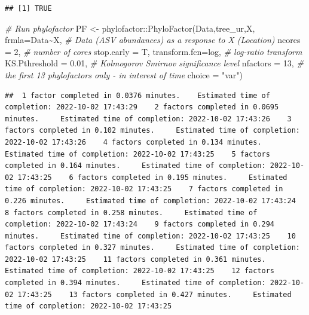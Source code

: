 \documentclass[
]{book}
\newenvironment{Shaded}{\begin{snugshade}}{\end{snugshade}}
\newcommand{\AttributeTok}[1]{\textcolor[rgb]{0.77,0.63,0.00}{#1}}
\newcommand{\CommentTok}[1]{\textcolor[rgb]{0.56,0.35,0.01}{\textit{#1}}}
\newcommand{\DecValTok}[1]{\textcolor[rgb]{0.00,0.00,0.81}{#1}}
\newcommand{\FloatTok}[1]{\textcolor[rgb]{0.00,0.00,0.81}{#1}}
\newcommand{\FunctionTok}[1]{\textcolor[rgb]{0.00,0.00,0.00}{#1}}
\newcommand{\NormalTok}[1]{#1}
\newcommand{\OtherTok}[1]{\textcolor[rgb]{0.56,0.35,0.01}{#1}}
\newcommand{\SpecialCharTok}[1]{\textcolor[rgb]{0.00,0.00,0.00}{#1}}
\newcommand{\StringTok}[1]{\textcolor[rgb]{0.31,0.60,0.02}{#1}}
\begin{document}
\begin{verbatim}
## [1] TRUE
\end{verbatim}

\begin{Shaded}
\begin{Highlighting}[]
\CommentTok{\# Run phylofactor}
\NormalTok{PF }\OtherTok{\textless{}{-}}\NormalTok{  phylofactor}\SpecialCharTok{::}\FunctionTok{PhyloFactor}\NormalTok{(Data,tree\_ur,X, }
        \AttributeTok{frmla=}\NormalTok{Data}\SpecialCharTok{\textasciitilde{}}\NormalTok{X,    }\CommentTok{\# Data (ASV abundances) as a response to X (Location)}
        \AttributeTok{ncores =} \DecValTok{2}\NormalTok{,      }\CommentTok{\# number of cores }
        \AttributeTok{stop.early =}\NormalTok{ T, }
        \AttributeTok{transform.fcn=}\NormalTok{log,    }\CommentTok{\# log{-}ratio transform}
        \AttributeTok{KS.Pthreshold =} \FloatTok{0.01}\NormalTok{, }\CommentTok{\# Kolmogorov Smirnov significance level }
        \AttributeTok{nfactors =} \DecValTok{13}\NormalTok{, }\CommentTok{\# the first 13 phylofactors only {-} in interest of time }
        \AttributeTok{choice =} \StringTok{"var"}\NormalTok{)}
\end{Highlighting}
\end{Shaded}

\begin{verbatim}
##  1 factor completed in 0.0376 minutes.    Estimated time of completion: 2022-10-02 17:43:29    2 factors completed in 0.0695 minutes.     Estimated time of completion: 2022-10-02 17:43:26    3 factors completed in 0.102 minutes.     Estimated time of completion: 2022-10-02 17:43:26    4 factors completed in 0.134 minutes.     Estimated time of completion: 2022-10-02 17:43:25    5 factors completed in 0.164 minutes.     Estimated time of completion: 2022-10-02 17:43:25    6 factors completed in 0.195 minutes.     Estimated time of completion: 2022-10-02 17:43:25    7 factors completed in 0.226 minutes.     Estimated time of completion: 2022-10-02 17:43:24    8 factors completed in 0.258 minutes.     Estimated time of completion: 2022-10-02 17:43:24    9 factors completed in 0.294 minutes.     Estimated time of completion: 2022-10-02 17:43:25    10 factors completed in 0.327 minutes.     Estimated time of completion: 2022-10-02 17:43:25    11 factors completed in 0.361 minutes.     Estimated time of completion: 2022-10-02 17:43:25    12 factors completed in 0.394 minutes.     Estimated time of completion: 2022-10-02 17:43:25    13 factors completed in 0.427 minutes.     Estimated time of completion: 2022-10-02 17:43:25   
\end{verbatim}
\end{document}
